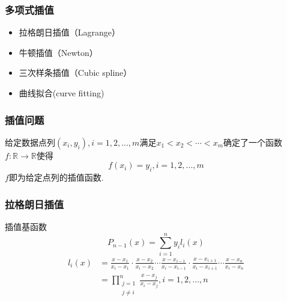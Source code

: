 \documentclass[red,compress]{beamer}
\begin{document}
\begin{frame}
\frametitle{多项式插值}
\begin{itemize}
\item 拉格朗日插值（Lagrange）
\item 牛顿插值（Newton）
\item 三次样条插值（Cubic spline）
\item 曲线拟合(curve fitting)
\end{itemize}
\end{frame}
\begin{frame}
\frametitle{插值问题}
给定数据点列$(x_i,y_i), i=1,2,...,m$满足$x_1<x_2<\cdots<x_m$确定了一个函数$f:\mathbb{R}\rightarrow\mathbb{R}$使得
\begin{equation*}
	f(x_i)=y_i, i=1,2,...,m
\end{equation*}
$f$即为给定点列的插值函数.
\end{frame}
\begin{frame}
\frametitle{拉格朗日插值}
插值基函数
\begin{equation*}
	P_{n-1}(x)=\sum_{i=1}^{n}y_{i}l_{i}(x)
\end{equation*}
\begin{align*}
	l_{i}(x)&=\frac{x-x_1}{x_i-x_1}\cdot\frac{x-x_2}{x_i-x_2}\cdots\frac{x-x_{i-1}}{x_i-x_{i-1}}\cdot\frac{x-x_{i+1}}{x_i-x_{i+1}}\cdots\frac{x-x_n}{x_i-x_n} \\
	&=\prod_{\substack{j=1 \\ j\neq i}}^{n}\frac{x-x_j}{x_i-x_j}, i=1,2,...,n
\end{align*}
\end{frame}
\end{document}
